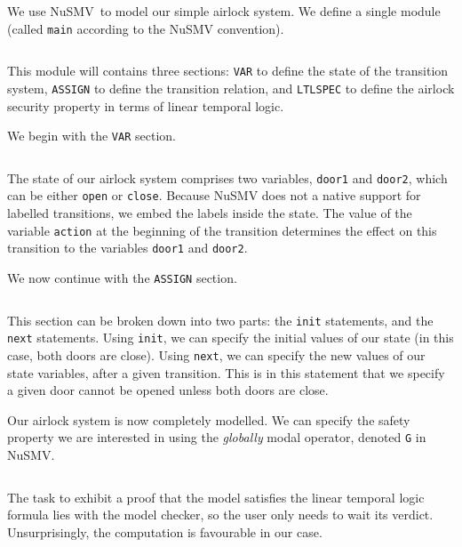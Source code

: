 \begin{example}
  We use NuSMV\,\cite{cimatti2002nusmv} to model our simple airlock system.
  We define a single module (called \texttt{main} according to the NuSMV
  convention).

  \inputminted[firstline=1,lastline=1]{coq}{Listings/Airlock1.nusmv}

  This module will contains three sections: \texttt{VAR} to define the state of
  the transition system, \texttt{ASSIGN} to define the transition relation, and
  \texttt{LTLSPEC} to define the airlock security property in terms of linear
  temporal logic.

  We begin with the \texttt{VAR} section.

  \inputminted[firstline=3,lastline=7]{coq}{Listings/Airlock1.nusmv}

  The state of our airlock system comprises two variables, \texttt{door1} and
  \texttt{door2}, which can be either \texttt{open} or \texttt{close}.
  Because NuSMV does not a native support for labelled transitions, we embed the
  labels inside the state.
  The value of the variable \texttt{action} at the beginning of the transition
  determines the effect on this transition to the variables \texttt{door1} and
  \texttt{door2}.

  We now continue with the \texttt{ASSIGN} section.

  \inputminted[firstline=9,lastline=31]{coq}{Listings/Airlock1.nusmv}

  This section can be broken down into two parts: the \texttt{init} statements,
  and the \texttt{next} statements.
  Using \texttt{init}, we can specify the initial values of our state (in this
  case, both doors are close).
  Using \texttt{next}, we can specify the new values of our state variables,
  after a given transition.
  This is in this statement that we specify a given door cannot be opened unless
  both doors are close.

  Our airlock system is now completely modelled.
  We can specify the safety property we are interested in using the
  \emph{globally} modal operator, denoted \texttt{G} in NuSMV.

  \inputminted[firstline=33,lastline=33]{coq}{Listings/Airlock1.nusmv}

  The task to exhibit a proof that the model satisfies the linear temporal logic
  formula lies with the model checker, so the user only needs to wait its
  verdict.
  Unsurprisingly, the computation is favourable in our case.


\end{example}
